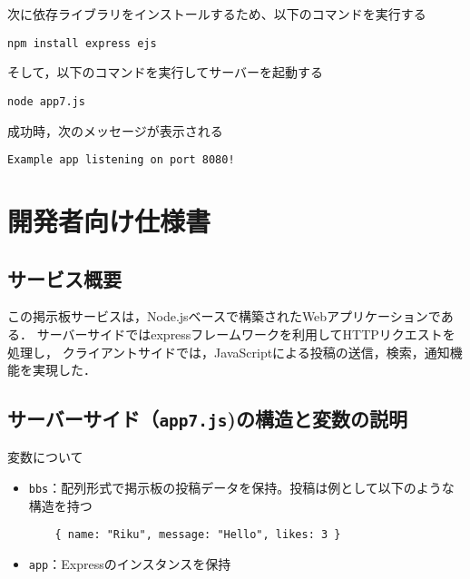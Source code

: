 \documentclass[uplatex,dvipdfmx]{jsarticle}
\begin{document}
次に依存ライブラリをインストールするため、以下のコマンドを実行する
\begin{verbatim}
npm install express ejs
\end{verbatim}

そして，以下のコマンドを実行してサーバーを起動する
\begin{verbatim}
node app7.js
\end{verbatim}

成功時，次のメッセージが表示される
\begin{verbatim}
Example app listening on port 8080!
\end{verbatim}

\section{開発者向け仕様書}

\subsection{サービス概要}
この掲示板サービスは，Node.jsベースで構築されたWebアプリケーションである．
サーバーサイドではexpressフレームワークを利用してHTTPリクエストを処理し，
クライアントサイドでは，JavaScriptによる投稿の送信，検索，通知機能を実現した．

\subsection{サーバーサイド（\texttt{app7.js})の構造と変数の説明}
変数について
\begin{itemize}
    \item \texttt{bbs}：配列形式で掲示板の投稿データを保持。投稿は例として以下のような構造を持つ
    \begin{verbatim}
    { name: "Riku", message: "Hello", likes: 3 }
    \end{verbatim}
    \item \texttt{app}：Expressのインスタンスを保持
\end{itemize}
\end{document}
